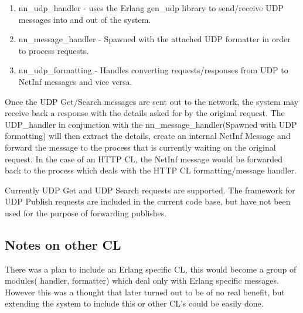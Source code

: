 \begin{enumerate}
\item nn\_udp\_handler - uses the Erlang gen\_udp library to send/receive UDP messages into and out of the system.
\item nn\_message\_handler - Spawned with the attached UDP formatter in order to process requests.
\item nn\_udp\_formatting - Handles converting requests/responses from UDP to NetInf messages and vice versa.
\end{enumerate}

Once the UDP Get/Search messages are sent out to the network, the system may receive back a response with the details asked for by the original request. The UDP\_handler in conjunction with the nn\_message\_handler(Spawned with UDP formatting) will then extract the details, create an internal NetInf Message and forward the message to the process that is currently waiting on the original request. In the case of an HTTP CL, the NetInf message would be forwarded back to the process which deals with the HTTP CL formatting/message handler.

Currently UDP Get and UDP Search requests are supported. The framework for UDP Publish requests are included in the current code base, but have not been used for the purpose of forwarding publishes. 

\subsection {Notes on other CL}

There was a plan to include an Erlang specific CL, this would become a group of modules( handler, formatter) which deal only with Erlang specific messages. However this was a thought that later turned out to be of no real benefit, but extending the system to include this or other CL's could be easily done. 
